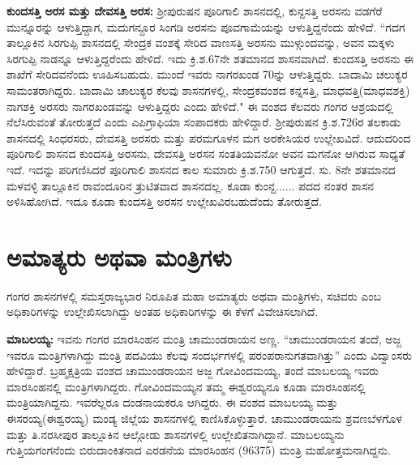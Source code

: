 \textbf{ಕುಂದಸತ್ತಿ ಅರಸ ಮತ್ತು ದೇವಸತ್ತಿ ಅರಸ:} ಶ‍್ರೀಪುರುಷನ ಪೂರಿಗಾಲಿ ಶಾಸನದಲ್ಲಿ, ಕುನ್ದಸತ್ತಿ ಅರಸನು ವಡಗೆರೆ ಮುನ್ನೂರನ್ನು ಆಳುತ್ತಿದ್ದಾಗ, ಮದುಗನ್ದೂರ ಸಿಂಗಡಿ ಅರಸನು ಪೂವಗಾಮೆಯನ್ನು ಆಳುತ್ತಿದ್ದನೆಂದು ಹೇಳಿದೆ. “ಗದಗ ತಾಲ್ಲೂಕಿನ ಸಿರಗುಪ್ಪಿ ಶಾಸನದಲ್ಲಿ ಸೇಂದ್ರಕ ವಂಶಕ್ಕೆ ಸೇರಿದ ವಾಣಸತ್ತಿ ಅರಸನು ಮುಳ್ಗುಂದವನ್ನು, ಅವನ ಮಕ್ಕಳು ಸಿರಗುಪ್ಪಿ ನಾಡನ್ನೂ ಆಳುತ್ತಿದ್ದರೆಂದು ಹೇಳಿದೆ. ಇದು ಕ್ರಿ.ಶ.6\enginline{-}7ನೇ ಶತಮಾನದ ಶಾಸನವಾಗಿದೆ. ಕುಂದಸತ್ತಿ ಅರಸನು ಈ ಶಾಖೆಗೆ ಸೇರಿದವನೆಂದು ಊಹಿಸಬಹುದು. ಮುಂದೆ ಇವರು ನಾಗರಖಂಡ 70ನ್ನು ಆಳುತ್ತಿದ್ದರು. ಬಾದಾಮಿ ಚಲುಕ್ಯರ ಸಾಮಂತರಾಗಿದ್ದರು. ಬಾದಾಮಿ ಚಾಲುಕ್ಯರ ಕೆಲವು ಶಾಸನಗಳಲ್ಲಿ, ಸೇಂದ್ರಕವಂಶದ ಕನ್ನಸತ್ತಿ, ಮಾಧವತ್ತಿ(ಮಾಧವಶಕ್ತಿ) ನಾಗಶಕ್ತಿ ಅರಸರು ನಾಗರಖಂಡವನ್ನು ಆಳುತ್ತಿದ್ದರು ಎಂದು ಹೇಳಿದೆ." ಈ ವಂಶದ ಕೆಲವರು ಗಂಗರ ಆಶ್ರಯದಲ್ಲಿ ನೆಲೆಸಿರುವಂತೆ ತೋರುತ್ತದೆ ಎಂದು ಎಪಿಗ್ರಾಫಿಯಾ ಸಂಪಾದಕರು ಹೇಳಿದ್ದಾರೆ. ಶ‍್ರೀಪುರುಷನ ಕ್ರಿ.ಶ.726ರ ತಲಕಾಡು ಶಾಸನದಲ್ಲಿ ಸಿಂಧರಸರು, ದೇವಸತ್ತಿ ಅರಸರು ಮತ್ತು ಪರಮಗೂಳನ ಮಗ ಅರಕೇಸಿಯರ ಉಲ್ಲೇಖವಿದೆ. ಆದುದರಿಂದ ಪೂರಿಗಾಲಿ ಶಾಸನದ ಕುಂದಸತ್ತಿ ಅರಸನು, ದೇವಸತ್ತಿ ಅರಸನ ಸಂತತಿಯವನೋ ಅವನ ಮಗನೋ ಆಗಿರುವ ಸಾಧ್ಯತೆ ಇದೆ. ಇದನ್ನು ಪರಿಗಣಿಸಿದರೆ ಪೂರಿಗಾಲಿ ಶಾಸನದ ಕಾಲ ಸುಮಾರು ಕ್ರಿ.ಶ.750 ಆಗುತ್ತದೆ. ಸು. 8ನೇ ಶತಮಾನದ ಮಳವಳ್ಳಿ ತಾಲ್ಲೂಕಿನ ರಾವಂದೂರಿನ ತ್ರುಟಿತವಾದ ಶಾಸನ\-ದಲ್ಲ. ಕೂಡಾ ಕುಂನ್ದ...... ಪದದ ನಂತರ ಶಾಸನ ಅಳಿಸಿಹೋಗಿದೆ. ಇದೂ ಕೂಡಾ ಕುಂದಸತ್ತಿ ಅರಸನ ಉಲ್ಲೇಖವಿರಬಹುದೆಂದು ತೋರುತ್ತದೆ.

\section{ಅಮಾತ್ಯರು ಅಥವಾ ಮಂತ್ರಿಗಳು}

ಗಂಗರ ಶಾಸನಗಳಲ್ಲಿ ಸಮಸ್ತರಾಜ್ಯಭಾರ ನಿರೂಪಿತ ಮಹಾ ಅಮಾತ್ಯರು ಅಥವಾ ಮಂತ್ರಿಗಳು, ಸಚಿವರು ಎಂಬ ಅಧಿಕಾರಿಗಳನ್ನು ಉಲ್ಲೇಖಿಸ\-ಲಾಗಿದ್ದು ಅಂತಹ ಅಧಿಕಾರಿಗಳನ್ನು ಈ ಕೆಳಗೆ ವಿವೇಚಿಸಲಾಗಿದೆ.

\vskip 2pt

\textbf{ಮಾಬಲಯ್ಯ:} ಇವನು ಗಂಗರ ಮಾರಸಿಂಹನ ಮಂತ್ರಿ ಚಾಮುಂಡರಾಯನ ಅಣ್ಣ. “ಚಾಮುಂಡರಾಯನ ತಂದೆ, ಅಜ್ಜ ಇವರೂ ಮಂತ್ರಿಗಳಾಗಿದ್ದು ಮಂತ್ರಿ ಪದವಿಯು ಕೆಲವು ಸಂದರ್ಭಗಳಲ್ಲಿ ಪರಂಪರಾನುಗತವಾಗಿತ್ತು” ಎಂದು ವಿದ್ವಾಂಸರು ಹೇಳಿದ್ದಾರೆ. ಬ್ರಹ್ಮಕ್ಷತ್ರಿಯ ವಂಶದ ಚಾಮುಂಡರಾಯನ ಅಜ್ಜ ಗೋವಿಂದಮಯ್ಯ, ತಂದೆ ಮಾಬಲಯ್ಯ ಇವರು ಮಾರಸಿಂಹನಲ್ಲಿ ಮಂತ್ರಿಗಳಾಗಿದ್ದರು. ಗೋವಿಂದಮಯ್ಯನ ತಮ್ಮ ಈಶ್ವರಯ್ಯನೂ ಕೂಡಾ ಮಾರಸಿಂಹನಲ್ಲಿ ಮಂತ್ರಿಯಾಗಿ\-ದ್ದನು. ಇವರೆಲ್ಲರೂ ದಂಡನಾಯಕರೂ ಆಗಿದ್ದರು. ಈ ವಂಶದ ಮಾಬಲಯ್ಯ ಮತ್ತು ಈಸರಯ್ಯ(ಈಶ್ವರಯ್ಯ) ಮಂಡ್ಯ ಜಿಲ್ಲೆಯ ಶಾಸನಗಳಲ್ಲಿ ಕಾಣಿಸಿಕೊಳ್ಳುತ್ತಾರೆ. ಚಾಮುಂಡರಾಯನು ಶ್ರವಣಬೆಳಗೊಳ ಮತ್ತು ತಿ.ನರಸೀಪುರ ತಾಲ್ಲೂಕಿನ ಆಲ್ಗೋಡು ಶಾಸನಗಳಲ್ಲಿ ಉಲ್ಲೇಖಿತನಾಗಿದ್ದಾನೆ. ಮಾಬಲಯ್ಯನು ಗುತ್ತಿಯಗಂಗನೆಂದು ಬಿರುದಾಂಕಿತನಾದ ಎರಡನೆಯ ಮಾರಸಿಂಹನ (963\enginline{-}75) ಮಂತ್ರಿ ಮಹೋತ್ತಮನಾಗಿದ್ದನು.

